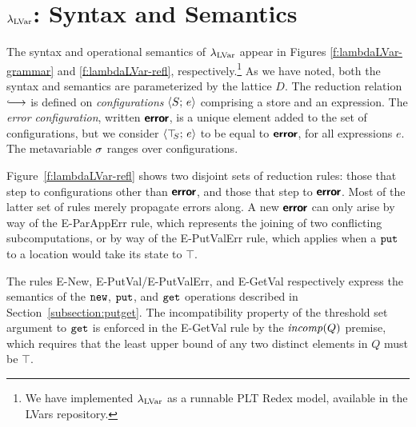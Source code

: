 

\section{$\lambda_{\textrm{LVar}}$: Syntax and Semantics}\label{section:programming}

The syntax and operational semantics of $\lambda_{\textrm{LVar}}$ appear in Figures
\ref{f:lambdaLVar-grammar} and \ref{f:lambdaLVar-refl}, respectively.\footnote{
We have implemented $\lambda_{\textrm{LVar}}$
as a runnable PLT Redex \cite{redex-book} model, available
in the LVars repository.}
As we have noted, both the syntax and semantics are
parameterized by the lattice $D$.  The reduction relation $\parstepsto$ is defined
on \emph{configurations} $\langle S;\, e \rangle$ comprising a store and an
expression.  
The \emph{error configuration}, written
$\textbf{\textsf{error}}$,
%
is a unique element added to the set of
  configurations, but 
we consider $\langle \top\hspace{-0.85mm}_{S};\, e \rangle$ to be equal to $\textbf{\textsf{error}}$, for all expressions $e$.
The metavariable $\sigma$ ranges over configurations.

Figure~\ref{f:lambdaLVar-refl} shows two disjoint sets of reduction
rules: those that step to configurations other than $\textbf{\textsf{error}}$, and
those that step to $\textbf{\textsf{error}}$. Most of the latter set of rules merely propagate errors along.
A new $\textbf{\textsf{error}}$ can only
arise by way of the {\sc E-ParAppErr} rule, which represents the joining of two
conflicting subcomputations, or by way of the {\sc E-PutValErr} rule,
which applies when a $\mbox{\texttt{put}}$ to a location would take 
its state to $\top$. 

The rules {\sc E-New}, {\sc E-PutVal}/{\sc E-PutValErr}, and {\sc E-GetVal} respectively express the semantics of
the $\mbox{\texttt{new}}$, $\mbox{\texttt{put}}$, and $\mbox{\texttt{get}}$ operations described in
Section~\ref{subsection:putget}.  
The incompatibility property of the threshold set argument to $\mbox{\texttt{get}}$ 
is enforced in the {\sc E-GetVal} rule by the $\mathit{incomp}(Q)$ premise,
which requires that the
least upper bound of any two distinct elements in $Q$ must be
$\top$.


